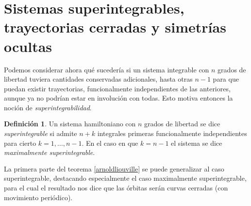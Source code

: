 \documentclass[11pt,a4paper,twoside]{article}
\theoremstyle{definition} \newtheorem{defn}[thm]{Definición}
\theoremstyle{definition} \newtheorem{ejemplo}[thm]{Ejemplo}
\theoremstyle{definition} \newtheorem{ejercicio}[thm]{Ejercicio}
\theoremstyle{remark} \newtheorem*{obs}{Observación}
\begin{document}
       \section{Sistemas superintegrables, trayectorias cerradas y simetrías ocultas}\label{superintegrables}
  Podemos considerar ahora qué sucedería si un sistema integrable con $n$ grados de libertad tuviera cantidades conservadas adicionales, hasta otras $n-1$ para que puedan existir trayectorias, funcionalmente independientes de las anteriores, aunque ya no podrían estar en involución con todas. Esto motiva entonces la noción de \emph{superintegrabilidad}.
  \begin{defn}
    Un sistema hamiltoniano con $n$ grados de libertad se dice \emph{superintegrable} si admite $n+k$ integrales primeras funcionalmente independientes para cierto $k=1,\dots,n-1$. En el caso en que $k=n-1$ el sistema se dice \emph{maximalmente superintegrable}.
  \end{defn}
  La primera parte del teorema \ref{arnoldliouville} se puede generalizar al caso superintegrable, destacando especialmente el caso maximalmente superintegrable, para el cual el resultado nos dice que las órbitas serán curvas cerradas (con movimiento periódico).
\end{document}
